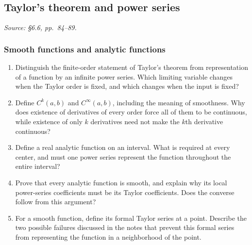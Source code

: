 \subsection{Taylor's theorem and power series}
\textit{Source: \S6.6, pp.~84--89.}

\subsubsection*{Smooth functions and analytic functions}
\begin{enumerate}[resume]
  \item Distinguish the finite-order statement of Taylor's theorem
    from representation of a function by an infinite power series.
    Which limiting variable changes when the Taylor order is fixed,
    and which changes when the input is fixed?

  \item Define \(C^k(a,b)\) and \(C^\infty(a,b)\), including the
    meaning of smoothness. Why does existence of derivatives of
    every order force all of them to be continuous, while existence
    of only \(k\) derivatives need not make the \(k\)th derivative continuous?

  \item Define a real analytic function on an interval.
    What is required at every center, and must one power series
    represent the function throughout the entire interval?

  \item Prove that every analytic function is smooth, and explain
    why its local power-series coefficients must be its Taylor
    coefficients. Does the converse follow from this argument?

  \item For a smooth function, define its formal Taylor series
    at a point. Describe the two possible failures discussed in
    the notes that prevent this formal series from representing
    the function in a neighborhood of the point.
\end{enumerate}

